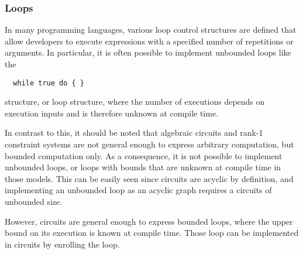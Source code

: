 \subsubsection{Loops} In many programming languages, various loop control structures are defined that allow developers to execute expressions with a specified number of repetitions or arguments. In particular, it is often possible to implement unbounded loops like the 
\begin{lstlisting}
  while true do { }
\end{lstlisting}
structure, or loop structure, where the number of executions depends on execution inputs and is therefore unknown at compile time.

In contrast to this, it should be noted that algebraic circuits and rank-1 constraint systems are not general enough to express arbitrary computation, but bounded computation only. As a consequence,  it is not possible to implement unbounded loops, or loops with bounds that are unknown at compile time in those models. This can be easily seen since circuits are acyclic by definition, and implementing an unbounded loop as an acyclic graph requires a circuits of unbounded size. 

However, circuits are general enough to express bounded loops, where the upper bound on its execution is known at compile time. Those loop can be implemented in circuits by enrolling the loop. 

